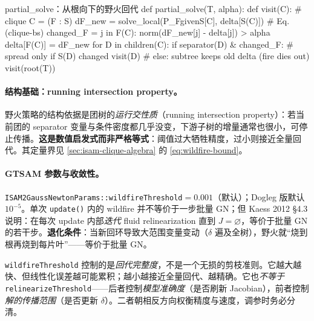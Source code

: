 \begin{algo}
\label{algo:wildfire}
\begin{codebox}[Python]{partial\_solve：从根向下的野火回代}
def partial_solve(T, alpha):
    def visit(C):                          # clique C = (F : S)
        dF_new = solve_local(P_FgivenS[C], delta[S(C)])  # Eq. (clique-bs)
        changed_F = {j in F(C):
                     norm(dF_new[j] - delta[j]) > alpha}
        delta[F(C)] = dF_new
        for D in children(C):
            if separator(D) & changed_F:   # spread only if S(D) changed
                visit(D)
            # else: subtree keeps old delta (fire dies out)
    visit(root(T))
\end{codebox}
\end{algo}

\paragraph{结构基础：running intersection property。}
野火策略的结构依据是团树的\emph{运行交性质}（running intersection property）：若当前团的 separator 变量与条件密度都几乎没变，下游子树的增量通常也很小，可停止传播。\textbf{这是数值启发式而非严格等式}：阈值过大牺牲精度，过小则接近全量回代。其定量界见 \cref{sec:isam-clique-algebra} 的 \cref{eq:wildfire-bound}。

\paragraph{GTSAM 参数与收敛性。}
\texttt{ISAM2GaussNewtonParams::wildfireThreshold}$=0.001$（默认）；Dogleg 版默认 $10^{-5}$。单次 \texttt{update()} 内的 wildfire 并不等价于一步批量 GN；但 Kaess 2012 §4.3\cite{kaess2012isam2} 说明：在每次 update 内部\emph{迭代} fluid relinearization 直到 $J=\varnothing$，等价于批量 GN 的若干步。\textbf{退化条件}：当新回环导致大范围变量变动（$\delta$ 遍及全树），野火就“烧到根再烧到每片叶”——等价于批量 GN。

\begin{pitfall}
\texttt{wildfireThreshold} 控制的是\emph{回代完整度}，不是一个无损的剪枝准则。它越大越快、但线性化误差越可能累积；越小越接近全量回代、越精确。它也\emph{不等于} \texttt{relinearizeThreshold}——后者控制\emph{模型准确度}（是否刷新 Jacobian），前者控制\emph{解的传播范围}（是否更新 $\delta$）。二者朝相反方向权衡精度与速度，调参时务必分清。
\end{pitfall}


